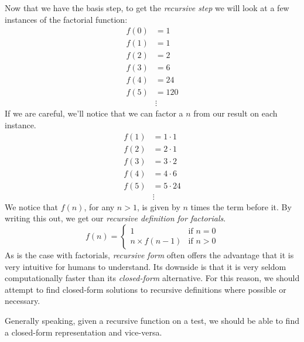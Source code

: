 \begin{ex}
\begin{sol}
    Now that we have the basis step, to get the \emph{recursive step} we will
    look at a few instances of the factorial function:
    \begin{align*}
      f(0) &= 1 \\
      f(1) &= 1 \\
      f(2) &= 2 \\
      f(3) &= 6 \\
      f(4) &= 24 \\
      f(5) &= 120 \\
      & \vdots
    \end{align*}
    If we are careful, we'll notice that we can factor a $n$ from our result on
    each instance.
    \begin{align*}
      f(1) &= 1\cdot1 \\
      f(2) &= 2\cdot1 \\
      f(3) &= 3 \cdot 2 \\
      f(4) &= 4 \cdot 6 \\
      f(5) &= 5 \cdot 24 \\
      &\vdots
    \end{align*}
    We notice that $f(n)$, for any $n > 1$, is given by $n$ times the term
    before it. By writing this out, we get our \emph{recursive definition for
    factorials}.
    \begin{equation}
      f(n) =
      \begin{cases}
        1 & \text{if }n=0 \\
        n \times f(n-1) & \text{if }n > 0
      \end{cases}
    \end{equation}
    As is the case with factorials, \emph{recursive form} often offers the
    advantage that it is very intuitive for humans to understand. Its downside is
    that it is very seldom computationally faster than its \emph{closed-form}
    alternative. For this reason, we should attempt to find closed-form
    solutions to recursive definitions where possible or necessary.

    Generally speaking, given a recursive function on a test, we should be able to find a
    closed-form representation and vice-versa.
  \end{sol}
\end{ex}
